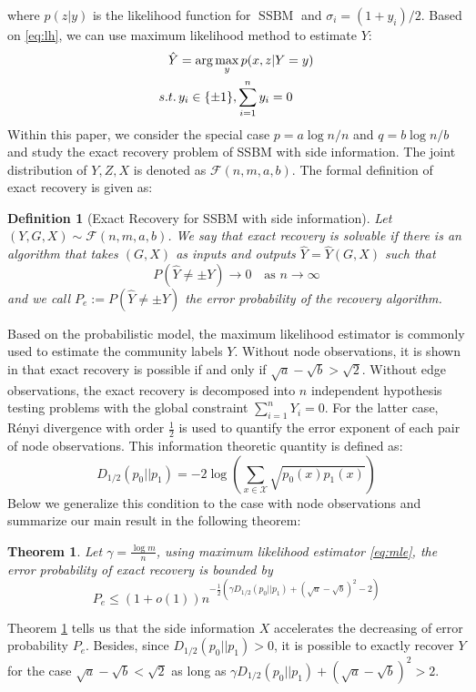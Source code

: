 \documentclass[conference]{IEEEtran}
\newtheorem{definition}{Definition}
\newtheorem{theorem}{Theorem}
\DeclareMathOperator{\SSBM}{SSBM}
\begin{document}
where $p(z|y)$ is the likelihood function for $\SSBM$ and $\sigma_i = (1+y_i)/2$.
Based on \eqref{eq:lh}, we can use maximum likelihood method to estimate
$Y$:
\begin{align}
    \hat{Y} &= \arg\max_y p(x,z|Y=y) \notag \\
    s.t.\, & y_i \in \{\pm 1\}, \sum_{i=1}^n y_i=0 \label{eq:mle}
\end{align}
Within this paper, we consider the special case $p = a \log n /n$ and $q = b \log n / b$ and study
the exact recovery problem of SSBM with side information. The joint distribution
of $Y,Z, X$ is denoted as $\mathcal{F}(n,m,a,b)$.
The formal definition of exact
recovery is given as:
\begin{definition}[Exact Recovery for SSBM with side information]
		Let $(Y,G,X) \sim \mathcal{F}(n,m,a,b)$.
		We say that exact recovery is solvable if there is an algorithm that takes $(G,X)$ as inputs and outputs $\hat{Y}=\hat{Y}(G,X)$ such that
		$$
		P(\hat{Y} \neq \pm Y) \to 0
		\text{~~~as~} n\to\infty
		$$
		and we call $P_e:=P(\hat{Y} \neq \pm Y)$ the error probability of the recovery algorithm.
\end{definition}
Based on the probabilistic model, the maximum likelihood estimator
is commonly used to estimate the community labels $Y$.
Without node observations, it is shown in \cite{abbe2015exact}
that exact recovery is possible if and only if $\sqrt{a} - \sqrt{b} > \sqrt{2}$.
Without edge observations, the exact recovery is decomposed into $n$
independent hypothesis testing problems with the global constraint $\sum_{i=1}^n Y_i=0$. For the latter case, Rényi divergence with order $\frac{1}{2}$
is used to quantify the error exponent of each pair of node observations.
This information theoretic quantity is defined as:
\begin{equation}
    D_{1/2}(p_0 || p_1) = -2\log(\sum_{x \in \mathcal{X}} \sqrt{p_0(x)p_1(x)} )
\end{equation}
Below we generalize this condition to the case with node observations and summarize
our main result in the following theorem:
\begin{theorem}\label{thm:Pe}
Let $\gamma = \frac{\log m}{n}$, using maximum likelihood estimator \eqref{eq:mle}, the error probability
of exact recovery is bounded by
\begin{equation}\label{eq:PeMain}
    P_e \leq (1+o(1)) n^{-\frac{1}{2}\left(\gamma D_{1/2}(p_0||p_1) + (\sqrt{a} - \sqrt{b})^2-2\right)}
\end{equation}
\end{theorem}
Theorem \ref{thm:Pe} tells us that the side information $X$ accelerates the
decreasing of error probability $P_e$. Besides, since 
$D_{1/2}(p_0||p_1) > 0$, it is possible to exactly recover $Y$
for the case $\sqrt{a} - \sqrt{b} < \sqrt{2}$ as long as $\gamma D_{1/2}(p_0||p_1) + (\sqrt{a} - \sqrt{b})^2 > 2$.
\end{document}

